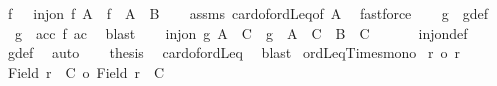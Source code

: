 \begin{isabellebody}
\ f\ \ {}{\isacharcolon}{\kern0pt}\ {\isachardoublequoteopen}inj{\isacharunderscore}{\kern0pt}on\ f\ A\ {\isasymand}\ f\ {\isacharbackquote}{\kern0pt}\ A\ {\isasymle}\ B{\isachardoublequoteclose}\isanewline
\ \ \isamarkupfalse%
\ assms\ card{\isacharunderscore}{\kern0pt}of{\isacharunderscore}{\kern0pt}ordLeq{\isacharbrackleft}{\kern0pt}of\ A{\isacharbrackright}{\kern0pt}\ \isamarkupfalse%
\ fastforce\isanewline
\ \ \isamarkupfalse%
\ g\ \ g{\isacharunderscore}{\kern0pt}def{\isacharcolon}{\kern0pt}\isanewline
\ \ {\isachardoublequoteopen}g\ {\isacharequal}{\kern0pt}\ {\isacharparenleft}{\kern0pt}{\isasymlambda}{\isacharparenleft}{\kern0pt}a{\isacharcomma}{\kern0pt}c{\isacharcolon}{\kern0pt}{\isacharcolon}{\kern0pt}{\isacharprime}{\kern0pt}c{\isacharparenright}{\kern0pt}{\isachardot}{\kern0pt}\ {\isacharparenleft}{\kern0pt}f\ a{\isacharcomma}{\kern0pt}c{\isacharparenright}{\kern0pt}{\isacharparenright}{\kern0pt}{\isachardoublequoteclose}\ \isamarkupfalse%
\ blast\isanewline
\ \ \isamarkupfalse%
\ {\isachardoublequoteopen}inj{\isacharunderscore}{\kern0pt}on\ g\ {\isacharparenleft}{\kern0pt}A\ {\isasymtimes}\ C{\isacharparenright}{\kern0pt}\ {\isasymand}\ g\ {\isacharbackquote}{\kern0pt}\ {\isacharparenleft}{\kern0pt}A\ {\isasymtimes}\ C{\isacharparenright}{\kern0pt}\ {\isasymle}\ {\isacharparenleft}{\kern0pt}B\ {\isasymtimes}\ C{\isacharparenright}{\kern0pt}{\isachardoublequoteclose}\isanewline
\ \ \isamarkupfalse%
\ {}\ \isamarkupfalse%
\ inj{\isacharunderscore}{\kern0pt}on{\isacharunderscore}{\kern0pt}def\ \isamarkupfalse%
\ g{\isacharunderscore}{\kern0pt}def\ \isamarkupfalse%
\ auto\isanewline
\ \ \isamarkupfalse%
\ {\isacharquery}{\kern0pt}thesis\ \isamarkupfalse%
\ card{\isacharunderscore}{\kern0pt}of{\isacharunderscore}{\kern0pt}ordLeq\ \isamarkupfalse%
\ blast\isanewline
{}\isamarkupfalse%
%
\endisatagproof
{\isafoldproof}%
%
\isadelimproof
\isanewline
%
\endisadelimproof
\isanewline
{}\isamarkupfalse%
\ ordLeq{\isacharunderscore}{\kern0pt}Times{\isacharunderscore}{\kern0pt}mono{}{\isacharcolon}{\kern0pt}\isanewline
{}\ {\isachardoublequoteopen}r\ {\isasymle}o\ r{\isacharprime}{\kern0pt}{\isachardoublequoteclose}\isanewline
{}\ {\isachardoublequoteopen}{\isacharbar}{\kern0pt}{\isacharparenleft}{\kern0pt}Field\ r{\isacharparenright}{\kern0pt}\ {\isasymtimes}\ C{\isacharbar}{\kern0pt}\ {\isasymle}o\ {\isacharbar}{\kern0pt}{\isacharparenleft}{\kern0pt}Field\ r{\isacharprime}{\kern0pt}{\isacharparenright}{\kern0pt}\ {\isasymtimes}\ C{\isacharbar}{\kern0pt}{\isachardoublequoteclose}\isanewline

\end{isabellebody}

